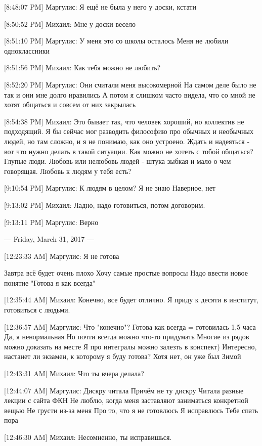\documentclass{article}
\begin{document}
[8:48:07 PM] Маргулис:
Я ещё не была у него у доски, кстати

[8:50:52 PM] Михаил:
Мне у доски весело

[8:51:10 PM] Маргулис:
У меня это со школы осталось
 Меня не любили одноклассники

[8:51:56 PM] Михаил:
Как тебя можно не любить?

[8:52:20 PM] Маргулис:
Они считали меня высокомерной
 На самом деле было не так и они мне долго нравились
 А потом я слишком часто видела, что со мной не хотят общаться и совсем от них закрылась

[8:54:38 PM] Михаил:
Это бывает так, что человек хороший, но коллектив не подходящий.
 Я бы сейчас мог разводить философию про обычных и необычных людей, но там сложно, и я не понимаю, как оно устроено.
 Ждать и надеяться - вот что нужно делать в такой ситуации.
 Как можно не хотеть с тобой общаться? Глупые люди.
 Любовь или нелюбовь людей - штука зыбкая и мало о чем говорящая.
 Любовь к людям у тебя есть?

[9:10:54 PM] Маргулис:
К людям в целом?
 Я не знаю
 Наверное, нет

[9:13:02 PM] Михаил:
Ладно, надо готовиться, потом договорим.

[9:13:11 PM] Маргулис:
Верно

--- Friday, March 31, 2017 ---

[12:23:33 AM] Маргулис:
Я не готова

 Завтра всё будет очень плохо
 Хочу самые простые вопросы
 Надо ввести новое понятие
 "Готова я как всегда"

[12:35:44 AM] Михаил:
Конечно, все будет отлично.
 Я приду к десяти в институт, готовиться с людьми.

[12:36:57 AM] Маргулис:
Что "конечно"?
 Готова как всегда = готовилась 1,5 часа
 Да, я ненормальная
 Но почти всегда можно что-то придумать
 Многие из рядов можно доказать на месте
 Я про интегралы можно залезть в конспект)
 Интересно, настанет ли экзамен, к которому я буду готова?
 Хотя нет, он уже был
 Зимой

[12:43:31 AM] Михаил:
Что ты вчера делала?

[12:44:07 AM] Маргулис:
Дискру читала 
Причём не ту дискру 
Читала разные лекции с сайта ФКН
 Не люблю, когда меня заставляют заниматься конкретной вещью
 Не грусти из-за меня
 Про то, что я не готовлюсь
 Я исправлюсь
 Тебе спать пора

[12:46:30 AM] Михаил:
Несомненно, ты исправишься.
\end{document}
